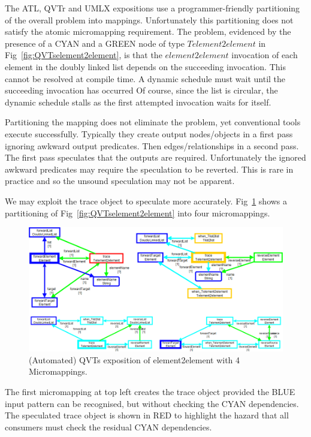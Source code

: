 \documentclass{llncs}
\begin{document}
The ATL, QVTr and UMLX expositions use a programmer-friendly partitioning of the overall problem into mappings. Unfortunately this partitioning does not satisfy the atomic micromapping requirement. The problem, evidenced by the presence of a CYAN and a GREEN node of type $Telement2element$ in Fig~\ref{fig:QVTselement2element}, is that the $element2element$ invocation of each element in the doubly linked list depends on the succeeding invocation. This cannot be resolved at compile time. A dynamic schedule must wait until the succeeding invocation has occurred Of course, since the list is circular, the dynamic schedule stalls as the first attempted invocation waits for itself.

Partitioning the mapping does not eliminate the problem, yet conventional tools execute successfully. Typically they create output nodes/objects in a first pass ignoring awkward output predicates. Then edges/relationships in a second pass. The first pass speculates that the outputs are required. Unfortunately the ignored awkward predicates may require the speculation to be reverted. This is rare in practice and so the unsound speculation may not be apparent.

We may exploit the trace object to speculate more accurately. Fig~\ref{fig:QVTsMicromappings} shows a partitioning of Fig~\ref{fig:QVTselement2element} into four micromappings.

\begin{figure}[h]
	\centering
	\includegraphics[width=1.0\textwidth]{QVTsMicromappings.png}
	\caption{(Automated) QVTs exposition of element2element with 4 Micromappings.}
	\label{fig:QVTsMicromappings}
\end{figure}

The first micromapping at top left creates the trace object provided the BLUE input pattern can be recognised, but without checking the CYAN dependencies. The speculated trace object is shown in RED to highlight the hazard that all consumers must check the residual CYAN dependencies.
\end{document}
